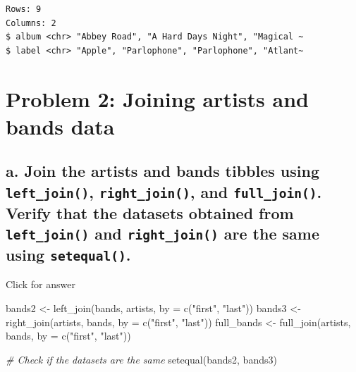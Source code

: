 \documentclass[
]{book}
\newenvironment{Shaded}{\begin{snugshade}}{\end{snugshade}}
\newcommand{\AttributeTok}[1]{\textcolor[rgb]{0.77,0.63,0.00}{#1}}
\newcommand{\CommentTok}[1]{\textcolor[rgb]{0.56,0.35,0.01}{\textit{#1}}}
\newcommand{\FunctionTok}[1]{\textcolor[rgb]{0.00,0.00,0.00}{#1}}
\newcommand{\NormalTok}[1]{#1}
\newcommand{\OtherTok}[1]{\textcolor[rgb]{0.56,0.35,0.01}{#1}}
\newcommand{\StringTok}[1]{\textcolor[rgb]{0.31,0.60,0.02}{#1}}
\begin{document}
\begin{verbatim}
Rows: 9
Columns: 2
$ album <chr> "Abbey Road", "A Hard Days Night", "Magical ~
$ label <chr> "Apple", "Parlophone", "Parlophone", "Atlant~
\end{verbatim}

\hypertarget{problem-2-joining-artists-and-bands-data}{%
\section{Problem 2: Joining artists and bands data}\label{problem-2-joining-artists-and-bands-data}}

\hypertarget{a.-join-the-artists-and-bands-tibbles-using-left_join-right_join-and-full_join.-verify-that-the-datasets-obtained-from-left_join-and-right_join-are-the-same-using-setequal.}{%
\subsection{\texorpdfstring{a. Join the artists and bands tibbles using \texttt{left\_join()}, \texttt{right\_join()}, and \texttt{full\_join()}. Verify that the datasets obtained from \texttt{left\_join()} and \texttt{right\_join()} are the same using \texttt{setequal()}.}{a. Join the artists and bands tibbles using left\_join(), right\_join(), and full\_join(). Verify that the datasets obtained from left\_join() and right\_join() are the same using setequal().}}\label{a.-join-the-artists-and-bands-tibbles-using-left_join-right_join-and-full_join.-verify-that-the-datasets-obtained-from-left_join-and-right_join-are-the-same-using-setequal.}}

Click for answer

\begin{Shaded}
\begin{Highlighting}[]
\NormalTok{bands2 }\OtherTok{\textless{}{-}} \FunctionTok{left\_join}\NormalTok{(bands, artists, }\AttributeTok{by =} \FunctionTok{c}\NormalTok{(}\StringTok{"first"}\NormalTok{, }\StringTok{"last"}\NormalTok{))}
\NormalTok{bands3 }\OtherTok{\textless{}{-}} \FunctionTok{right\_join}\NormalTok{(artists, bands, }\AttributeTok{by =} \FunctionTok{c}\NormalTok{(}\StringTok{"first"}\NormalTok{, }\StringTok{"last"}\NormalTok{))}
\NormalTok{full\_bands }\OtherTok{\textless{}{-}} \FunctionTok{full\_join}\NormalTok{(artists, bands, }\AttributeTok{by =} \FunctionTok{c}\NormalTok{(}\StringTok{"first"}\NormalTok{, }\StringTok{"last"}\NormalTok{))}

\CommentTok{\# Check if the datasets are the same}
\FunctionTok{setequal}\NormalTok{(bands2, bands3)}
\end{Highlighting}
\end{Shaded}
\end{document}
